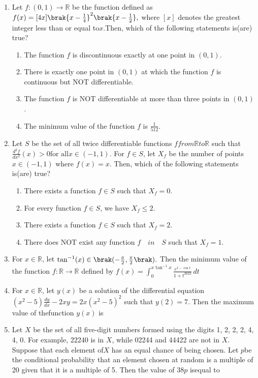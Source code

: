 \documentclass[12pt,a4paper]{article}
\begin{document}
\begin{enumerate}
\item Let $f : (0,1) \to \mathbb{R}$ be the function defined as $ f(x) =  [4x] \brak{x-\frac{1}{4}}^2 \brak{x-\frac{1}{2}},$ where $[x]$ denotes the greatest integer less than or equal to$x.$Then, which of the following statements is(are) true?
\begin{enumerate}
\item The function $f$ is discontinuous exactly at one point in $(0,1)$.
\item There is exactly one point in $(0,1)$ at which the function $f$ is continuous but NOT differentiable.
\item The function $f$ is NOT differentiable at more than three points in $(0,1)$.
\item The minimum value of the function $f$ is $\frac{1}{512}$.
\end{enumerate}

\item Let $S$ be the set of all twice differentiable functions $f from \mathbb{R} to \mathbb{R}$ such that $ \frac{d^2 f}{dx^2}(x) > 0  \text{for all}  x \in (-1, 1).$ For $f \in S$, let ${X_{f}}$ be the number of points $x \in (-1, 1)$ where $f(x) = x$. Then, which of the following statements is(are) true?
\begin{enumerate}
\item There exists a function $f \in S$ such that ${X_{f}} = 0$.
\item For every function $f \in S$, we have ${X_{f}} \leq 2$.
\item There exists a function $f \in S$ such that ${X_{f}} = 2$.
\item There does NOT exist any function $f \quad in \quad S$ such that ${X_{f}} = 1$.
\end{enumerate}

\item For $x \in \mathbb{R}$, let $\tan^{-1}(x) \in \brak( -\frac{\pi}{2}, \frac{\pi}{2} \brak).$ Then the minimum value of the function $f: \mathbb{R} \to \mathbb{R}$ defined by $f(x) =  \int_0^{x\tan^{-1}x} \frac{e^{t-\cos t}}{1+t^{2023}}\, dt$

\item For $x \in \mathbb{R}$, let $y(x)$ be a solution of the differential equation $ (x^2 - 5) \frac{dy}{dx} - 2xy = 2x{(x^2 - 5)^2}$  such that $y(2) = 7$. Then the maximum value of thefunction $y(x)$ is

\item Let $X$ be the set of all five-digit numbers formed using the digits 1, 2, 2, 2, 4, 4, 0. For example, 22240 is in $X$, while 02244 and 44422 are not in $X$. Suppose that each element of$X$ has an equal chance of being chosen. Let $p$be the conditional probability that an element chosen at random is a multiple of 20 given that it is a multiple of 5. Then the value of $38p$ isequal to


\end{enumerate}
\end{document}
